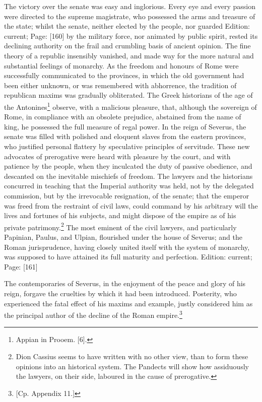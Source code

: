 The victory over the senate was easy and inglorious. Every eye and every passion were directed to the supreme magistrate, who possessed the arms and treasure of the state; whilst the senate, neither elected by the people, nor guarded Edition: current; Page: [160] by the military force, nor animated by public spirit, rested its declining authority on the frail and crumbling basis of ancient opinion. The fine theory of a republic insensibly vanished, and made way for the more natural and substantial feelings of monarchy. As the freedom and honours of Rome were successfully communicated to the provinces, in which the old government had been either unknown, or was remembered with abhorrence, the tradition of republican maxims was gradually obliterated. The Greek historians of the age of the Antonines\footnote{Appian in Prooem. [6].} observe, with a malicious pleasure, that, although the sovereign of Rome, in compliance with an obsolete prejudice, abstained from the name of king, he possessed the full measure of regal power. In the reign of Severus, the senate was filled with polished and eloquent slaves from the eastern provinces, who justified personal flattery by speculative principles of servitude. These new advocates of prerogative were heard with pleasure by the court, and with patience by the people, when they inculcated the duty of passive obedience, and descanted on the inevitable mischiefs of freedom. The lawyers and the historians concurred in teaching that the Imperial authority was held, not by the delegated commission, but by the irrevocable resignation, of the senate; that the emperor was freed from the restraint of civil laws, could command by his arbitrary will the lives and fortunes of his subjects, and might dispose of the empire as of his private patrimony.\footnote{Dion Cassius seems to have written with no other view, than to form these opinions into an historical system. The Pandects will show how assiduously the lawyers, on their side, laboured in the cause of prerogative.} The most eminent of the civil lawyers, and particularly Papinian, Paulus, and Ulpian, flourished under the house of Severus; and the Roman jurisprudence, having closely united itself with the system of monarchy, was supposed to have attained its full maturity and perfection.
Edition: current; Page: [161]

The contemporaries of Severus, in the enjoyment of the peace and glory of his reign, forgave the cruelties by which it had been introduced. Posterity, who experienced the fatal effect of his maxims and example, justly considered him as the principal author of the decline of the Roman empire.\footnote{[Cp. Appendix 11.]}

